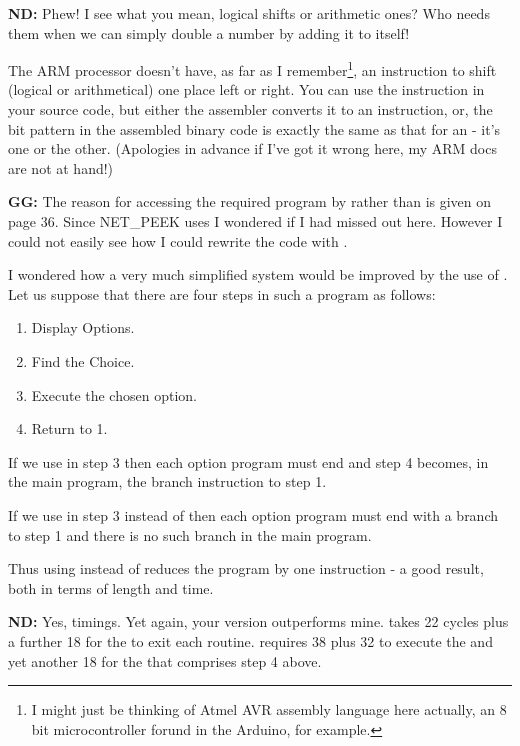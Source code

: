 \textbf{ND: }Phew! I see what you mean, logical shifts or arithmetic ones? Who needs them when we can simply double a number by adding it to itself!

The ARM processor doesn't have, as far as I remember\footnote{I might just be thinking of Atmel AVR assembly language here actually, an 8 bit microcontroller forund in the Arduino, for example.}, an instruction to shift (logical or arithmetical) one place left or right. You can use the instruction in your source code, but either the assembler converts it to an  instruction, or, the bit pattern in the assembled binary code is exactly the same as that for an  - it's one or the other. (Apologies in advance if I've got it wrong here, my ARM docs are not at hand!)

\textbf{GG: }The reason for accessing the required program by  rather than  is given on page 36. Since NET\_PEEK uses  I wondered if I had missed out here. However I could not easily see how I could rewrite the code with .

I wondered how a very much simplified system would be improved by the use of . Let us suppose that there are four steps in such a program as follows:

\begin{enumerate}
\item Display Options.
\item Find the Choice.
\item Execute the chosen option.
\item Return to 1.
\end{enumerate}

If we use  in step 3 then each option program must end  and step 4 becomes, in the main program, the branch instruction to step 1.

If we use  in step 3 instead of  then each option program must end with a branch to step 1 and there is no such branch in the main program.

Thus using  instead of  reduces the program by one instruction - a good result, both in terms of length and time.

\textbf{ND: }Yes, timings. Yet again, your version outperforms mine.  takes 22 cycles plus a further 18 for the  to exit each routine.  requires 38 plus 32 to execute the  and yet another 18 for the  that comprises step 4 above. 

